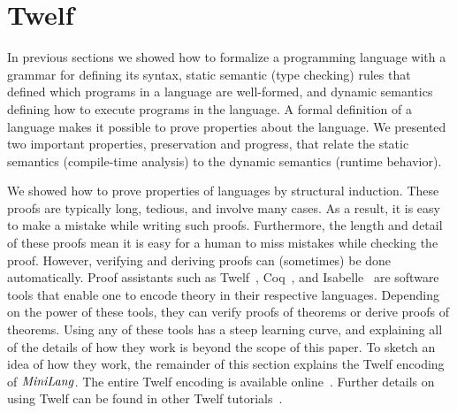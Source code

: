 \section{Twelf}
\label{sec:twelf}
In previous sections we showed how to formalize
a programming language with a grammar for defining
its syntax, static semantic (type checking) rules that
defined which programs in a language are well-formed,
and dynamic semantics defining how to execute programs in the language.
A formal definition of a language makes it possible to
prove properties about the language.
We presented two important properties,
preservation and progress, that relate the static semantics
(compile-time analysis) to the dynamic semantics
(runtime behavior).

We showed how to prove properties of languages by
structural induction.
These proofs are typically long, tedious,
and involve many cases.
As a result, it is easy to make a mistake while
writing such proofs.
Furthermore, the length and detail of these proofs mean
it is easy for a human to miss mistakes while checking
the proof.
However, verifying and deriving proofs can (sometimes)
be done automatically.
Proof assistants such as Twelf~\cite{Twelf},
Coq~\cite{Coq}, and Isabelle~\cite{Isabelle} are software tools
that enable one to encode theory in their respective languages.
Depending on the power of these tools, they can
verify proofs of theorems or derive proofs
of theorems.
Using any of these tools has a steep learning curve,
and explaining all of the details of how they work
is beyond the scope of this paper.
To sketch an idea of how they work,
the remainder of this section explains
the Twelf encoding of $\mathit{MiniLang}$.
The entire Twelf encoding is available
online~\cite{twelf-tutorial}.
Further details on using Twelf can be found in other
Twelf tutorials~\cite{TwelfTutorial}.





